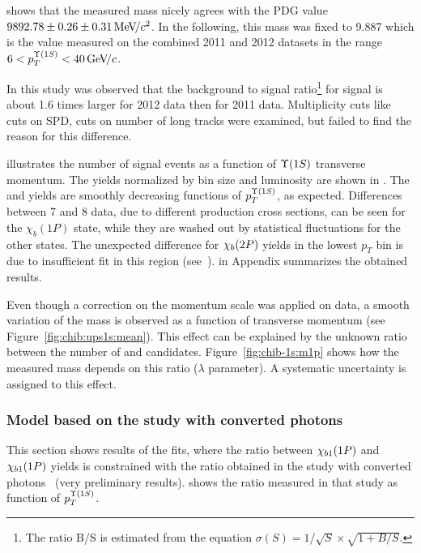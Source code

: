  shows that the measured \chiboneOneP mass
nicely agrees with the PDG value $9892.78 \pm 0.26 \pm 0.31 {\mathrm{\,Me\kern -0.1em V\!/}c^2}$. In
the following, this mass was fixed to 9.887 \gevcc which is the value 
measured on the combined 2011 and 2012 datasets in the range $6<p_T^{\Y1S}<40\gevc$.

In this study was observed that the background to signal ratio\footnote{ The
ratio B/S is estimated  from the equation $\sigma(S) = 1/\sqrt{S} \times
\sqrt{1 + B/S}$. } for \chibThreeP signal  is about 1.6 times
larger for 2012 data then for 2011 data. Multiplicity cuts like cuts on
SPD, cuts on number of long tracks were examined, but failed to find the reason
for this difference.



 illustrates the number of signal events as
a function of $\Y1S$ transverse momentum. The yields
normalized by bin size and luminosity are shown in
. The \chibOneP and \chibThreeP yields
are smoothly decreasing functions of $p_T^{\Y1S}$, as expected. Differences between 7 and 8\tev
data, due to different production cross sections, can be seen for the
$\chi_b(1P)$ state, while they are washed out by statistical fluctuations for
the other states. The unexpected difference for $\chi_{b}(2P)$ yields in the lowest
$p_T$ bin is due to insufficient fit in this region (see~).
 in Appendix summarizes the
obtained results.



Even though a correction on the momentum scale was applied on data, a smooth variation of the
\chiboneOneP mass is observed as a function of transverse momentum (see
Figure~\ref{fig:chib:ups1s:mean}). This effect can be explained by the unknown
ratio between the number of \chiboneOneP and \chiboneTwoP candidates.
Figure~\ref{fig:chib-1s:m1p} shows how the measured mass depends on this ratio
($\lambda$ parameter). A systematic uncertainty is assigned to this effect.




\subsubsection{Model based on the study with converted photons}
This section shows results of the fits, where the ratio between
$\chi_{b 1}(1P)$ and $\chi_{b 1}(1P)$ yields is constrained with the ratio obtained
in the study with converted photons~\cite{Lespinasse:1664279} (very preliminary
results).  shows the ratio measured in that study as function
of $p_T^{\Y1S}$.

